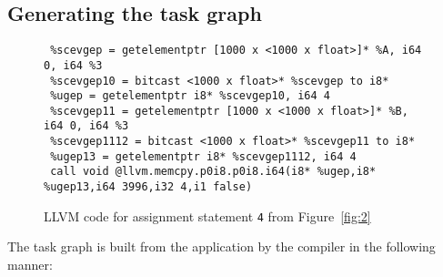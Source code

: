 \subsection{Generating the task graph}
\label{sec:build-appl-graph}

\begin{figure*}[t!]
  \centering
\begin{verbatim}
 %scevgep = getelementptr [1000 x <1000 x float>]* %A, i64 0, i64 %3
 %scevgep10 = bitcast <1000 x float>* %scevgep to i8*
 %ugep = getelementptr i8* %scevgep10, i64 4
 %scevgep11 = getelementptr [1000 x <1000 x float>]* %B, i64 0, i64 %3
 %scevgep1112 = bitcast <1000 x float>* %scevgep11 to i8*
 %ugep13 = getelementptr i8* %scevgep1112, i64 4
 call void @llvm.memcpy.p0i8.p0i8.i64(i8* %ugep,i8* %ugep13,i64 3996,i32 4,i1 false)
\end{verbatim}
  \caption{LLVM code for assignment statement \texttt{4} from
    Figure~\ref{fig:2}}
  \label{fig:3}
\end{figure*}

The task graph is built from the application by the compiler %
in the
following manner:


